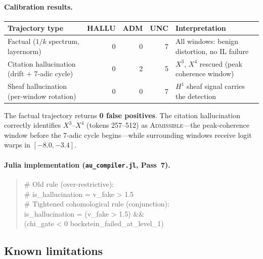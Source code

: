 \documentclass[11pt,a4paper]{article}
\begin{document}
\paragraph{Calibration results.}
\begin{center}
\renewcommand{\arraystretch}{1.3}\small
\begin{tabularx}{\linewidth}{lrrrp{4.2cm}}
\toprule
\textbf{Trajectory type} & \textbf{HALLU} & \textbf{ADM} & \textbf{UNC}
  & \textbf{Interpretation} \\
\midrule
Factual ($1/k$ spectrum, layernorm)
  & 0 & 0 & 7
  & All windows: benign distortion, no IL failure \\
Citation hallucination (drift $+$ 7-adic cycle)
  & 0 & 2 & 5
  & $X^3$, $X^4$ rescued (peak coherence window) \\
Sheaf hallucination (per-window rotation)
  & 0 & 0 & 7
  & $H^1$ sheaf signal carries the detection \\
\bottomrule
\end{tabularx}
\end{center}

The factual trajectory returns \textbf{0 false positives}.
The citation hallucination correctly identifies $X^3$--$X^4$
(tokens 257--512) as \textsc{Admissible}---the peak-coherence
window before the 7-adic cycle begins---while surrounding
windows receive logit warps in $[-8.0, -3.4]$.

\paragraph{Julia implementation (\texttt{au\_compiler.jl}, Pass~7).}
\begin{quote}\small\ttfamily
\# Old rule (over-restrictive):\\
\# is\_hallucination = v\_fake > 1.5\\[4pt]
\# Tightened cohomological rule (conjunction):\\
is\_hallucination = (v\_fake > 1.5) \&\&\\
\hspace{2em}(chi\_gate < 0 \textbar{}\textbar{} bockstein\_failed\_at\_level\_1)
\end{quote}

\subsection{Known limitations}
\end{document}
